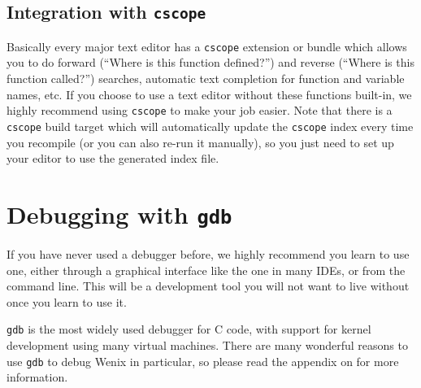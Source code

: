 \subsection{Integration with \texttt{cscope}}

Basically every major text editor has a \texttt{cscope} extension or bundle which allows you to do forward (``Where is this function defined?'') and reverse (``Where is this function called?'') searches, automatic text completion for function and variable names, etc. If you choose to use a text editor without these functions built-in, we highly recommend using \texttt{cscope} to make your job easier. Note that there is a \texttt{cscope} build target which will automatically update the \texttt{cscope} index every time you recompile (or you can also re-run it manually), so you just need to set up your editor to use the generated index file.

\section{Debugging with \texttt{gdb}}

If you have never used a debugger before, we highly recommend you learn to use one, either through a graphical interface like the one in many IDEs, or from the command line. This will be a development tool you will not want to live without once you learn to use it.

\texttt{gdb} is the most widely used debugger for C code, with support for kernel development using many virtual machines. There are many wonderful reasons to use \texttt{gdb} to debug Wenix in particular, so please read the appendix on  for more information.

